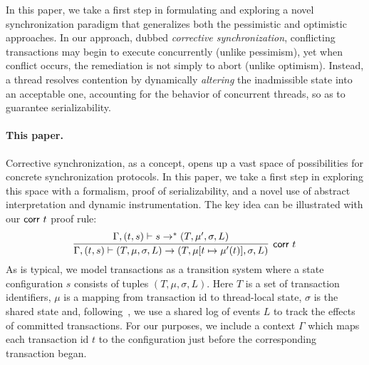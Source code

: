 %
In this paper, we take a first step in formulating and exploring a novel synchronization paradigm that generalizes both the pessimistic and optimistic approaches.
%
In our approach, dubbed \emph{corrective synchronization}, conflicting transactions may begin to execute concurrently (unlike pessimism), yet when conflict occurs, the remediation is not simply to abort (unlike optimism). Instead, a thread resolves contention by dynamically \emph{altering} the inadmissible state into an acceptable one, accounting for the behavior of concurrent threads, so as to guarantee serializability.


\paragraph{This paper.} Corrective synchronization, as a concept, opens up a vast space of possibilities for concrete synchronization protocols. In this paper, we take a first step in exploring this space with a formalism, proof of serializability, and a novel use of abstract interpretation and dynamic instrumentation.
%
The key idea can be illustrated with our ${\sf corr}\ t$ proof rule:
$$
\infer[\text{{\sf corr }} t]{\Gamma, (t,s) \vdash (T, \mu, \sigma, L) \rightarrow (T,\mu[t \mapsto \mu'(t)], \sigma, L)}{
   \Gamma, (t,s) \vdash
	s \rightarrow^{*} (T,\mu', \sigma, L)}
$$
As is typical, we model transactions as a transition system
where a state configuration $s$ consists of tuples $(T,\mu,\sigma,L)$.
Here $T$ is a set of transaction identifiers,  $\mu$ is a mapping from
transaction id to thread-local  state, $\sigma$ is the shared state
and, following~\cite{KoskinenP15}, we use a shared log of events $L$ to track the
effects of committed transactions.
%
For our purposes, we include a context $\Gamma$ which maps each transaction
id $t$ to the configuration just before the corresponding transaction began.

